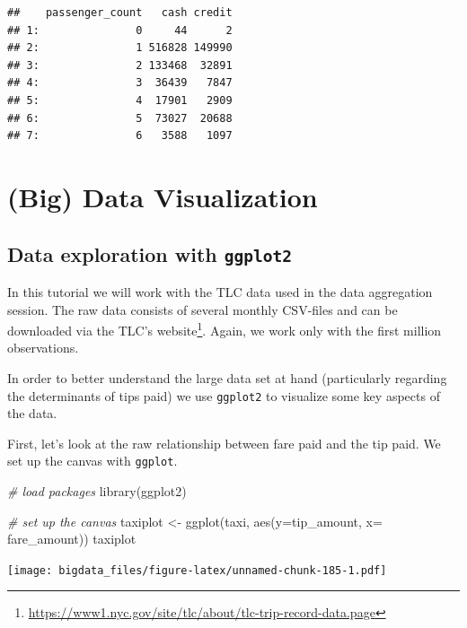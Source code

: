 \documentclass[
  12pt,
]{style/krantz}
\newenvironment{Shaded}{\begin{snugshade}}{\end{snugshade}}
\newcommand{\AttributeTok}[1]{\textcolor[rgb]{0.77,0.63,0.00}{#1}}
\newcommand{\CommentTok}[1]{\textcolor[rgb]{0.56,0.35,0.01}{\textit{#1}}}
\newcommand{\FunctionTok}[1]{\textcolor[rgb]{0.00,0.00,0.00}{#1}}
\newcommand{\NormalTok}[1]{#1}
\newcommand{\OtherTok}[1]{\textcolor[rgb]{0.56,0.35,0.01}{#1}}
\renewcommand{\href}[2]{#2\footnote{\url{#1}}}
\begin{document}
\begin{verbatim}
##    passenger_count   cash credit
## 1:               0     44      2
## 2:               1 516828 149990
## 3:               2 133468  32891
## 4:               3  36439   7847
## 5:               4  17901   2909
## 6:               5  73027  20688
## 7:               6   3588   1097
\end{verbatim}

\hypertarget{big-data-visualization}{%
\chapter{(Big) Data Visualization}\label{big-data-visualization}}

\hypertarget{data-exploration-with-ggplot2}{%
\section{\texorpdfstring{Data exploration with \texttt{ggplot2}}{Data exploration with ggplot2}}\label{data-exploration-with-ggplot2}}

In this tutorial we will work with the TLC data used in the data aggregation session. The raw data consists of several monthly CSV-files and can be downloaded via the \href{https://www1.nyc.gov/site/tlc/about/tlc-trip-record-data.page}{TLC's website}. Again, we work only with the first million observations.

In order to better understand the large data set at hand (particularly regarding the determinants of tips paid) we use \texttt{ggplot2} to visualize some key aspects of the data.

First, let's look at the raw relationship between fare paid and the tip paid. We set up the canvas with \texttt{ggplot}.

\begin{Shaded}
\begin{Highlighting}[]
\CommentTok{\# load packages}
\FunctionTok{library}\NormalTok{(ggplot2)}

\CommentTok{\# set up the canvas}
\NormalTok{taxiplot }\OtherTok{\textless{}{-}} \FunctionTok{ggplot}\NormalTok{(taxi, }\FunctionTok{aes}\NormalTok{(}\AttributeTok{y=}\NormalTok{tip\_amount, }\AttributeTok{x=}\NormalTok{ fare\_amount)) }
\NormalTok{taxiplot}
\end{Highlighting}
\end{Shaded}

\texttt{[image: bigdata\_files/figure-latex/unnamed-chunk-185-1.pdf]}
\end{document}
